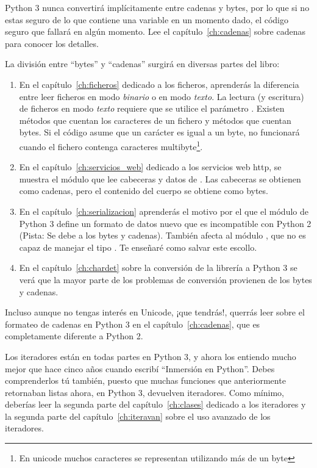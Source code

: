 Python 3 nunca convertirá implícitamente entre cadenas y bytes, por lo que si no estas seguro de lo que contiene una variable en un momento dado, el código seguro que fallará en algún momento. Lee el capítulo~\ref{ch:cadenas} sobre cadenas para conocer los detalles.

La división entre ``bytes'' y ``cadenas'' surgirá en diversas partes del libro:

\begin{enumerate}
\item En el capítulo~\ref{ch:ficheros} dedicado a los ficheros, aprenderás la diferencia entre leer ficheros en modo \emph{binario} o en modo \emph{texto}. La lectura (y escritura) de ficheros en modo \emph{texto} requiere que se utilice el parámetro . Existen métodos que cuentan los caracteres de un fichero y métodos que cuentan bytes. Si el código asume que un carácter es igual a un byte, no funcionará cuando el fichero contenga caracteres multibyte\footnote{En unicode muchos caracteres se representan utilizando más de un byte}.

\item En el capítulo~\ref{ch:servicios_web} dedicado a los servicios web http, se muestra el módulo  que lee cabeceras y datos de . Las cabeceras se obtienen como cadenas, pero el contenido del cuerpo se obtiene como bytes.

\item En el capítulo~\ref{ch:serializacion} aprenderás el motivo por el que el módulo  de Python 3 define un formato de datos nuevo que es incompatible con Python 2 (Pista: Se debe a los bytes y cadenas). También afecta al módulo , que no es capaz de manejar el tipo . Te enseñaré como salvar este escollo.

\item En el capítulo~\ref{ch:chardet} sobre la conversión de la librería  a Python 3 se verá que la mayor parte de los problemas de conversión provienen de los bytes y cadenas.
\end{enumerate}

Incluso aunque no tengas interés en Unicode, ¡que tendrás!, querrás leer sobre el formateo de cadenas en Python 3 en el capítulo~\ref{ch:cadenas}, que es completamente diferente a Python 2.

Los iteradores están en todas partes en Python 3, y ahora los entiendo mucho mejor que hace cinco años cuando escribí ``Inmersión en Python''. Debes comprenderlos tú también, puesto que muchas funciones que anteriormente retornaban listas ahora, en Python 3, devuelven iteradores. Como mínimo, deberías leer la segunda parte del capítulo~\ref{ch:clases} dedicado a los iteradores y la segunda parte del capítulo~\ref{ch:iteravan} sobre el uso avanzado de los iteradores.

